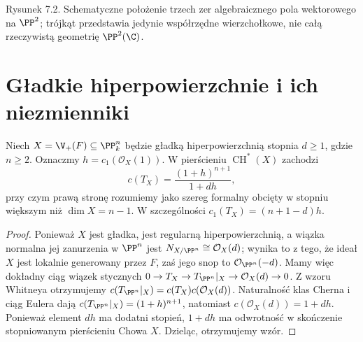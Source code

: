 \begin{center}
\begin{minipage}{\linewidth}
\centering
{}

{\small Rysunek 7.2. Schematyczne położenie trzech zer algebraicznego pola wektorowego na $\PP^2$; trójkąt przedstawia jedynie współrzędne wierzchołkowe, nie całą rzeczywistą geometrię $\PP^2(\C)$.}
\end{minipage}
\end{center}

\section{Gładkie hiperpowierzchnie i ich niezmienniki}
\label{sec:ga7-hypersurfaces}

\begin{twierdzenie}
\label{tw:ga7-hypersurface-chern}
Niech $X=\V_+(F)\subseteq\PP^n_k$ będzie gładką
hiperpowierzchnią stopnia $d\ge1$, gdzie $n\ge2$.
Oznaczmy $h=c_1(\mathcal O_X(1))$.
W pierścieniu $\operatorname{CH}^*(X)$ zachodzi
\[
 c(T_X)=\frac{(1+h)^{n+1}}{1+dh},
\]
przy czym prawą stronę rozumiemy jako szereg formalny
obcięty w stopniu większym niż $\dim X=n-1$.
W szczególności $c_1(T_X)=(n+1-d)h$.
\end{twierdzenie}
\begin{proof}
Ponieważ $X$ jest gładka, jest regularną hiperpowierzchnią,
a wiązka normalna jej zanurzenia w $\PP^n$ jest
$N_{X/\PP^n}\cong\mathcal O_X(d)$; wynika to
z tego, że ideał $X$ jest lokalnie generowany przez $F$,
zaś jego snop to $\mathcal O_{\PP^n}(-d)$.
Mamy więc dokładny ciąg wiązek stycznych
$0\to T_X\to T_{\PP^n}|_X\to\mathcal O_X(d)\to0$.
Z wzoru Whitneya otrzymujemy
$c(T_{\PP^n}|_X)=c(T_X)c(\mathcal O_X(d))$.
Naturalność klas Cherna i ciąg Eulera dają
$c(T_{\PP^n}|_X)=(1+h)^{n+1}$, natomiast
$c(\mathcal O_X(d))=1+dh$.
Ponieważ element $dh$ ma dodatni stopień, $1+dh$
ma odwrotność w skończenie stopniowanym pierścieniu
Chowa $X$. Dzieląc, otrzymujemy wzór.
\end{proof}

